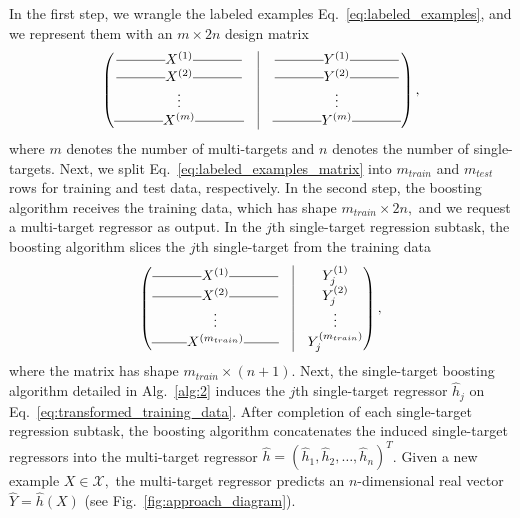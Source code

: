 \documentclass[aps,twocolumn,superscriptaddress,floatfix,preprintnumbers,showkeys]{revtex4}
\begin{document}
In the first step, we wrangle the labeled examples Eq.~\ref{eq:labeled_examples}, and we represent them with an $m \times 2n$ design matrix
\begin{equation}
\label{eq:labeled_examples_matrix}
\begin{pmatrix}
\rule[.5ex]{3.5em}{0.4pt} X^{(1)} \rule[.5ex]{3.5em}{0.4pt} & \vline & \rule[.5ex]{3.5em}{0.4pt} Y^{(1)} \rule[.5ex]{3.5em}{0.4pt}\\  
\rule[.5ex]{3.5em}{0.4pt} X^{(2)} \rule[.5ex]{3.5em}{0.4pt} & \vline & \rule[.5ex]{3.5em}{0.4pt} Y^{(2)} \rule[.5ex]{3.5em}{0.4pt}\\
\vdots & \vline & \vdots\\
\rule[.5ex]{3.5em}{0.4pt} X^{(m)} \rule[.5ex]{3.5em}{0.4pt} & \vline & \rule[.5ex]{3.5em}{0.4pt} Y^{(m)} \rule[.5ex]{3.5em}{0.4pt}\\  
\end{pmatrix},
\end{equation}
where $m$ denotes the number of multi-targets and $n$ denotes the number of single-targets. Next, we split Eq.~\ref{eq:labeled_examples_matrix} into $m_{train}$ and $m_{test}$ rows for training and test data, respectively. In the second step, the boosting algorithm receives the training data, which has shape $m_{train} \times 2n,$ and we request a multi-target regressor as output. In the $j$th single-target regression subtask, the boosting algorithm slices the $j$th single-target from the training data
\begin{equation}
\label{eq:transformed_training_data}
\begin{pmatrix}
\rule[.5ex]{3.5em}{0.4pt} X^{(1)} \rule[.5ex]{3.5em}{0.4pt} & \vline & Y_{j}^{(1)}\\  
\rule[.5ex]{3.5em}{0.4pt} X^{(2)} \rule[.5ex]{3.5em}{0.4pt} & \vline & Y_{j}^{(2)}\\
\vdots & \vline & \vdots\\
\rule[.5ex]{2.5em}{0.4pt} X^{(m_{train})} \rule[.5ex]{2.5em}{0.4pt} & \vline & Y_{j}^{(m_{train})}\\  
\end{pmatrix},
\end{equation}
where the matrix has shape $m_{train} \times (n + 1).$ Next, the single-target boosting algorithm detailed in Alg.~\ref{alg:2} induces the $j$th single-target regressor $\hat{h}_{j}$ on Eq.~\ref{eq:transformed_training_data}. After completion of each single-target regression subtask, the boosting algorithm concatenates the induced single-target regressors into the multi-target regressor
$\hat{h} = (\hat{h}_{1}, \hat{h}_{2}, \dots, \hat{h}_{n})^{T}$. Given a new example $X \in \mathcal{X},$ the multi-target regressor predicts an $n$-dimensional real vector $\hat{Y} = \hat{h}(X)$ (see Fig.~\ref{fig:approach_diagram}).
\end{document}
